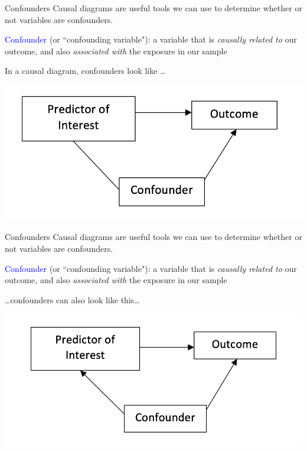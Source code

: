 \documentclass[10pt,t]{beamer}
\begin{document}
\begin{frame}{Confounders}
Causal diagrams are useful tools we can use to determine whether or not variables are confounders.

\vspace{0.3cm}

\textcolor{blue}{Confounder} (or ``confounding variable"): a variable that is \textit{causally related to} our outcome, and also \textit{associated with} the exposure in our sample

\vspace{0.3cm} \pause

In a causal diagram, confounders look like \dots

\vspace{0.3cm}

\centering \includegraphics[scale=0.4]{confounder1.png}

\end{frame}

\begin{frame}{Confounders}
Causal diagrams are useful tools we can use to determine whether or not variables are confounders.

\vspace{0.3cm}

\textcolor{blue}{Confounder} (or ``confounding variable"): a variable that is \textit{causally related to} our outcome, and also \textit{associated with} the exposure in our sample

\vspace{0.3cm} 

\dots confounders can also look like this\dots

\vspace{0.3cm}

\centering \includegraphics[scale=0.4]{confounder2.png}
\end{frame}
\end{document}
